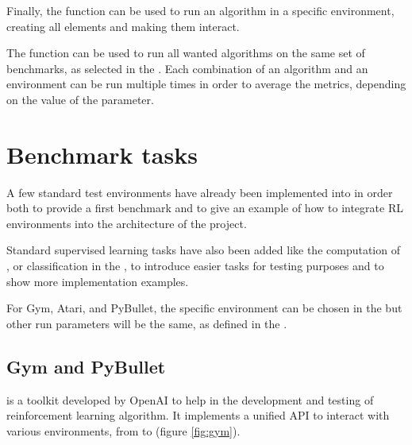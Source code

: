 Finally, the  function can be used to run an algorithm in a specific environment, creating all elements and making them interact. 

The  function can be used to run all wanted algorithms on the same set of benchmarks, as selected in the . Each combination of an algorithm and an environment can be run multiple times in order to average the metrics, depending on the value of the  parameter.

\section{Benchmark tasks}
A few standard test environments have already been implemented into \berl in order both to provide a first benchmark and to give an example of how to integrate RL environments into the architecture of the project. 

Standard supervised learning tasks have also been added like the computation of , or classification in the , to introduce easier tasks for testing purposes and to show more implementation examples.

For Gym, Atari, and PyBullet, the specific environment can be chosen in the  but other run parameters will be the same, as defined in the .

\subsection{Gym and PyBullet}
 is a toolkit developed by OpenAI to help in the development and testing of reinforcement learning algorithm. It implements a unified API to interact with various environments, from  to  (figure \ref{fig:gym}).

